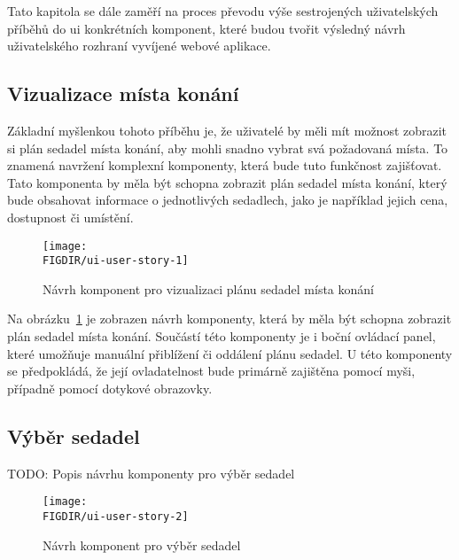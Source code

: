 Tato kapitola se dále zaměří na proces převodu výše sestrojených uživatelských příběhů do \ac{ui} konkrétních komponent, které budou tvořit výsledný návrh uživatelského rozhraní vyvíjené webové aplikace.

\subsection{Vizualizace místa konání}
\label{subsec:narvh-ui-transformace-uzivatelskych-pribehu-vizualizace-mista-konani}
\userstoryvenuemap

Základní myšlenkou tohoto příběhu je, že uživatelé by měli mít možnost zobrazit si plán sedadel místa konání, aby mohli snadno vybrat svá požadovaná místa.
To znamená navržení komplexní komponenty, která bude tuto funkčnost zajišťovat.
Tato komponenta by měla být schopna zobrazit plán sedadel místa konání, který bude obsahovat informace o jednotlivých sedadlech, jako je například jejich cena, dostupnost či umístění.

\begin{figure}[hbt]
    \centering
    \texttt{[image: \\FIGDIR/ui-user-story-1]}
    \caption{Návrh komponent pro vizualizaci plánu sedadel místa konání}
    \label{fig:ui-user-story-1}
\end{figure}

Na obrázku~\ref{fig:ui-user-story-1} je zobrazen návrh komponenty, která by měla být schopna zobrazit plán sedadel místa konání.
Součástí této komponenty je i boční ovládací panel, které umožňuje manuální přiblížení či oddálení plánu sedadel.
U této komponenty se předpokládá, že její ovladatelnost bude primárně zajištěna pomocí myši, případně pomocí dotykové obrazovky.

\subsection{Výběr sedadel}
\label{subsec:narvh-ui-transformace-uzivatelskych-pribehu-vyber-sedadel}
\userstoryseatselection

TODO: Popis návrhu komponenty pro výběr sedadel

\begin{figure}[hbt]
    \centering
    \texttt{[image: \\FIGDIR/ui-user-story-2]}
    \caption{Návrh komponent pro výběr sedadel}
    \label{fig:ui-user-story-2}
\end{figure}

